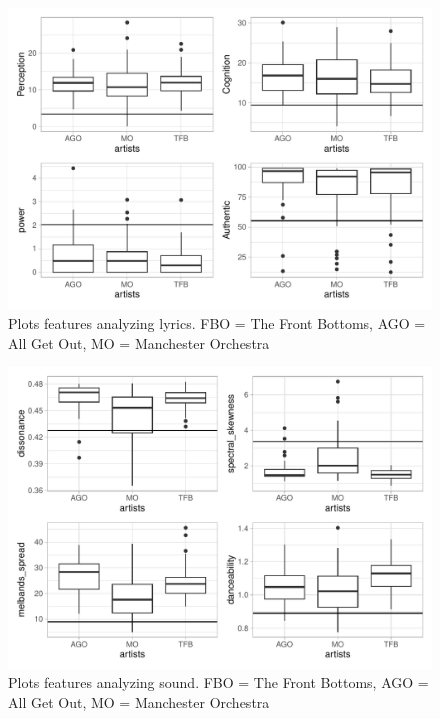 \documentclass{article}\usepackage[]{graphicx}\usepackage[]{xcolor}
\begin{document}
\begin{multicols}{2}
   \begin{figure}[H]
    \begin{center}
       \includegraphics[scale=0.4]{lyrics.pdf}
       \caption{Plots features analyzing lyrics. FBO = The Front Bottoms, AGO = 
       All Get Out, MO = Manchester Orchestra}
     \label{lyrics plot}
     \end{center}
   \end{figure}
   \begin{figure}[H]
    \begin{center}
       \includegraphics[scale=0.4]{sound1.pdf}
       \caption{Plots features analyzing sound. FBO = The Front Bottoms, AGO = 
       All Get Out, MO = Manchester Orchestra}
     \label{sound1}
     \end{center}
   \end{figure}

\end{multicols}
\end{document}
